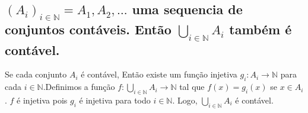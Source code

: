 \subsection{$(A_i)_{i\in \mathbb{N}}=A_1, A_2, \hdots$ uma sequencia de conjuntos contáveis. Então $\bigcup\limits_{i \in \mathbb{N}} A_i$ também é contável.}

\begin{spacing}{1.5}
  Se cada conjunto $A_i$ é contável, Então existe um função injetiva $g_i:A_i \rightarrow \mathbb{N}$ para cada $i \in \mathbb{N}$.Definimos a função $f: \bigcup\limits_{i \in \mathbb{N}} A_i \rightarrow \mathbb{N}$ tal que $f(x) = g_i(x)$ se $x \in A_i$. $f$ é injetiva pois $g_i$ é injetiva para todo $i \in \mathbb{N}$. Logo, $\bigcup\limits_{i \in \mathbb{N}} A_i$ é contável.
\end{spacing}